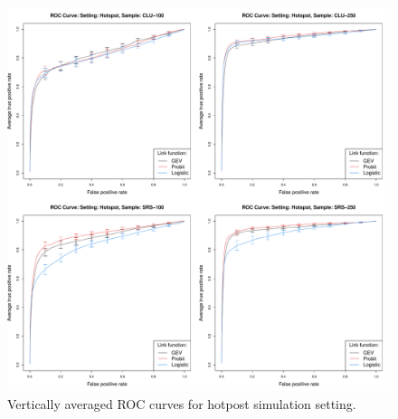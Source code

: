 \begin{figure}
  \includegraphics[width=\linewidth]{plots/sim-perf-hotspot}
  \caption{Vertically averaged ROC curves for hotpost simulation setting.}
  \label{rbfig:simrochot}
\end{figure}


